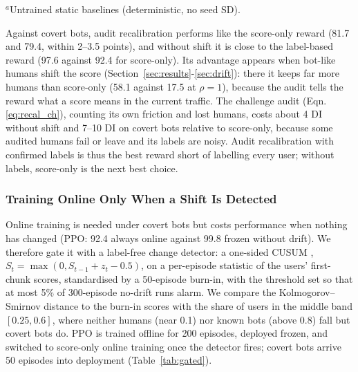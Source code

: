 \documentclass{ieeetj}
\begin{document}
\begin{table}[!t]
\vspace{2pt}
{\scriptsize $^a$Untrained static baselines (deterministic, no seed SD).}
\end{table}

Against covert bots, audit recalibration performs like the score-only reward (81.7 and 79.4, within 2--3.5 points), and without shift it is close to the label-based reward (97.6 against 92.4 for score-only). 
Its advantage appears when bot-like humans shift the score (Section~\ref{sec:results}-\ref{sec:drift}): there it keeps far more humans than score-only (58.1 against 17.5 at $\rho=1$), because the audit tells the reward what a score means in the current traffic. 
The challenge audit (Eqn. \eqref{eq:recal_ch}), counting its own friction and lost humans, costs about 4 DI without shift and 7--10 DI on covert bots relative to score-only, because some audited humans fail or leave and its labels are noisy. 
Audit recalibration with confirmed labels is thus the best reward short of labelling every user; without labels, score-only is the next best choice.

\vspace{-15pt}
\subsubsection{Training Online Only When a Shift Is Detected}
Online training is needed under covert bots but costs performance when nothing has changed (PPO: 92.4 always online against 99.8 frozen without drift). 
We therefore gate it with a label-free change detector: a one-sided CUSUM \cite{page_1954}, $S_t=\max(0,S_{t-1}+z_t-0.5)$, on a per-episode statistic of the users' first-chunk scores, standardised by a 50-episode burn-in, with the threshold set so that at most 5\% of 300-episode no-drift runs alarm. 
We compare the Kolmogorov--Smirnov distance to the burn-in scores with the share of users in the middle band $[0.25,0.6]$, where neither humans (near 0.1) nor known bots (above 0.8) fall but covert bots do. 
PPO is trained offline for 200 episodes, deployed frozen, and switched to score-only online training once the detector fires; covert bots arrive 50 episodes into deployment (Table~\ref{tab:gated}).
\end{document}
